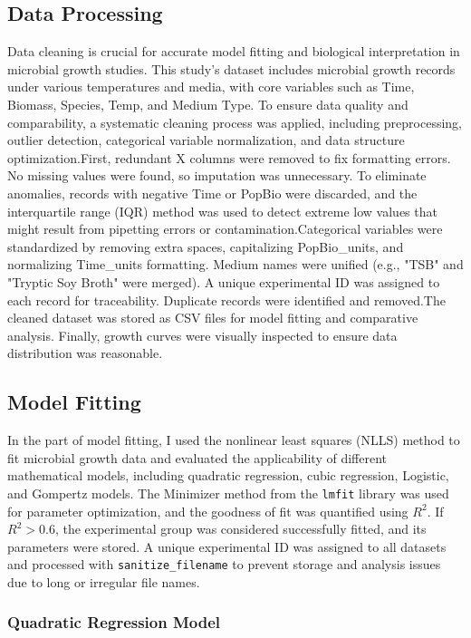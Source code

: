 \documentclass[11pt]{article}
\begin{document}
\subsection{Data Processing}
Data cleaning is crucial for accurate model fitting and biological interpretation in microbial growth studies. This study's dataset includes microbial growth records under various temperatures and media, with core variables such as Time, Biomass, Species, Temp, and Medium Type. To ensure data quality and comparability, a systematic cleaning process was applied, including preprocessing, outlier detection, categorical variable normalization, and data structure optimization.First, redundant X columns were removed to fix formatting errors. No missing values were found, so imputation was unnecessary. To eliminate anomalies, records with negative Time or PopBio were discarded, and the interquartile range (IQR) method was used to detect extreme low values that might result from pipetting errors or contamination.Categorical variables were standardized by removing extra spaces, capitalizing PopBio\_units, and normalizing Time\_units formatting. Medium names were unified (e.g., "TSB" and "Tryptic Soy Broth" were merged). A unique experimental ID was assigned to each record for traceability. Duplicate records were identified and removed.The cleaned dataset was stored as CSV files for model fitting and comparative analysis. Finally, growth curves were visually inspected to ensure data distribution was reasonable.

\subsection{Model Fitting}

In the part of model fitting, I used the nonlinear least squares (NLLS) method to fit microbial growth data and evaluated the applicability of different mathematical models, including quadratic regression, cubic regression, Logistic, and Gompertz models. The Minimizer method from the \texttt{lmfit} library was used for parameter optimization, and the goodness of fit was quantified using \( R^2 \). If \( R^2 > 0.6 \), the experimental group was considered successfully fitted, and its parameters were stored. A unique experimental ID was assigned to all datasets and processed with \texttt{sanitize\_filename} to prevent storage and analysis issues due to long or irregular file names.

\subsubsection{Quadratic Regression Model}
\end{document}
